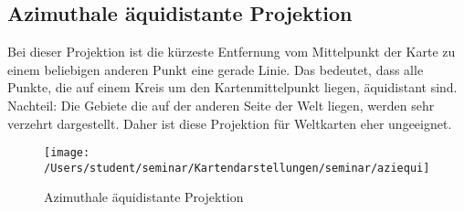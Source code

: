 \subsection{Azimuthale äquidistante Projektion}
\label{sec:azimuequi}
Bei dieser Projektion ist die kürzeste Entfernung vom Mittelpunkt der Karte zu einem beliebigen anderen Punkt eine gerade Linie. Das bedeutet, dass alle Punkte, die auf einem Kreis um den Kartenmittelpunkt liegen, äquidistant sind.\\
Nachteil:\newline
Die Gebiete die auf der anderen Seite der Welt liegen, werden sehr verzehrt dargestellt. Daher ist diese Projektion für Weltkarten 
eher ungeeignet.\\
\begin{figure}[hbtp]
\centering
\texttt{[image: /Users/student/seminar/Kartendarstellungen/seminar/aziequi]} \\
\caption{Azimuthale äquidistante Projektion}
\end{figure}
\clearpage